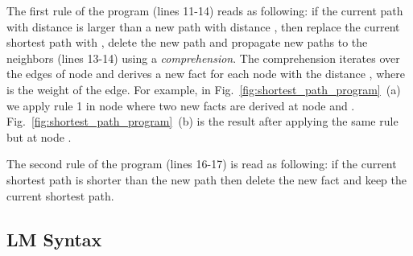 The first rule of the program (lines 11-14) reads as following: if the current
 path  with distance  is larger
than a new path  with distance , then replace the
current shortest path with , delete the new  path and
propagate new paths to the neighbors (lines 13-14) using a \emph{comprehension}.
The comprehension iterates over the edges of node  and derives a new
 fact for each node  with the distance ,
where  is the weight of the edge. For
example, in Fig.~\ref{fig:shortest_path_program}~(a) we apply rule 1 in node
 where two new  facts are derived at node 
and . Fig.~\ref{fig:shortest_path_program}~(b) is the result after
applying the same rule but at node .

The second rule of the program (lines 16-17) is read as following: if the
current shortest path  is shorter than the new path  then
delete the new  fact and keep the current shortest path.

\subsection{LM Syntax}

